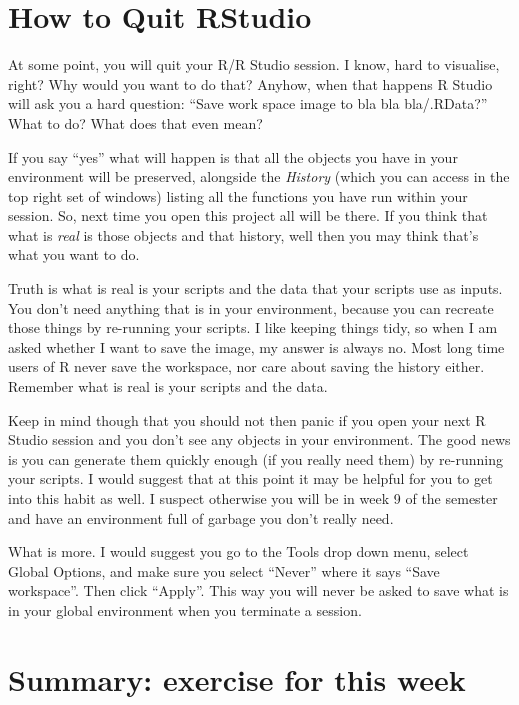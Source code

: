 \documentclass[
]{book}
\begin{document}
\section{How to Quit RStudio}\label{how-to-quit-rstudio}

At some point, you will quit your R/R Studio session. I know, hard to visualise, right? Why would you want to do that? Anyhow, when that happens R Studio will ask you a hard question: ``Save work space image to bla bla bla/.RData?'' What to do? What does that even mean?

If you say ``yes'' what will happen is that all the objects you have in your environment will be preserved, alongside the \emph{History} (which you can access in the top right set of windows) listing all the functions you have run within your session. So, next time you open this project all will be there. If you think that what is \emph{real} is those objects and that history, well then you may think that's what you want to do.

Truth is what is real is your scripts and the data that your scripts use as inputs. You don't need anything that is in your environment, because you can recreate those things by re-running your scripts. I like keeping things tidy, so when I am asked whether I want to save the image, my answer is always no. Most long time users of R never save the workspace, nor care about saving the history either. Remember what is real is your scripts and the data.

Keep in mind though that you should not then panic if you open your next R Studio session and you don't see any objects in your environment. The good news is you can generate them quickly enough (if you really need them) by re-running your scripts. I would suggest that at this point it may be helpful for you to get into this habit as well. I suspect otherwise you will be in week 9 of the semester and have an environment full of garbage you don't really need.

What is more. I would suggest you go to the Tools drop down menu, select Global Options, and make sure you select ``Never'' where it says ``Save workspace''. Then click ``Apply''. This way you will never be asked to save what is in your global environment when you terminate a session.

\section{Summary: exercise for this week}\label{summary-exercise-for-this-week}
\end{document}
